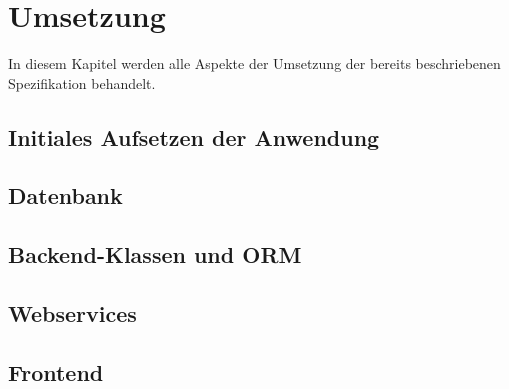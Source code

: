 \section{Umsetzung}
In diesem Kapitel werden alle Aspekte der Umsetzung der bereits beschriebenen Spezifikation behandelt. 
\subsection{Initiales Aufsetzen der Anwendung}
\subsection{Datenbank}
\subsection{Backend-Klassen und ORM}
\subsection{Webservices}
\subsection{Frontend}